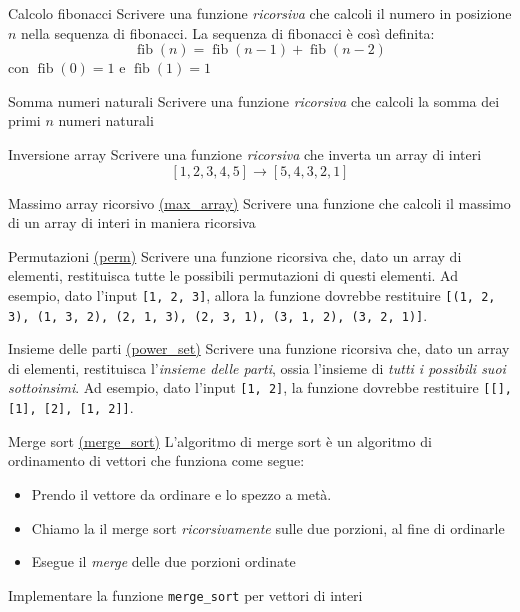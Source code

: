 \begin{esercizio}{Calcolo fibonacci}
	Scrivere una funzione \textit{ricorsiva} che calcoli il numero in posizione $ n $ nella sequenza di fibonacci. La sequenza di fibonacci è così definita:
	\[
		\operatorname{fib}\left(n\right) = \operatorname{fib}\left(n-1\right) + \operatorname{fib}\left(n-2\right)
	\]
	con $ \operatorname{fib}\left(0\right) = 1 $ e $ \operatorname{fib}\left(1\right) = 1 $
\end{esercizio}

\begin{esercizio}{Somma numeri naturali}
	Scrivere una funzione \textit{ricorsiva} che calcoli la somma dei primi $ n $ numeri naturali
\end{esercizio}

\begin{esercizio}{Inversione array}
	Scrivere una funzione \textit{ricorsiva} che inverta un array di interi
	\[
		\left[1,2,3,4,5\right] \rightarrow \left[5,4,3,2,1\right]
	\]
\end{esercizio}
\begin{esercizio}{Massimo array ricorsivo \href{run:./files/python/esercizi/ricorsione}{(max\_array)}}
	Scrivere una funzione che calcoli il massimo di un array di interi in maniera ricorsiva
\end{esercizio}

\begin{esercizio}{Permutazioni \href{run:./files/python/esercizi/ricorsione}{(perm)}}
	Scrivere una funzione ricorsiva che, dato un array di elementi, restituisca tutte le possibili permutazioni di questi elementi. Ad esempio, dato l'input \verb|[1, 2, 3]|, allora la funzione dovrebbe restituire \verb|[(1, 2, 3), (1, 3, 2), (2, 1, 3), (2, 3, 1), (3, 1, 2), (3, 2, 1)]|.
\end{esercizio}

\begin{esercizio}{Insieme delle parti \href{run:./files/python/esercizi/ricorsione}{(power\_set)}}
	Scrivere una funzione ricorsiva che, dato un array di elementi, restituisca l'\textit{insieme delle parti}, ossia l'insieme di \textit{tutti i possibili suoi sottoinsimi}. Ad esempio, dato l'input \verb|[1, 2]|, la funzione dovrebbe restituire \verb|[[], [1], [2], [1, 2]]|.
\end{esercizio}


\begin{esercizio}{Merge sort \href{run:./files/python/esercizi/ricorsione}{(merge\_sort)}}
	L'algoritmo di merge sort è un algoritmo di ordinamento di vettori che funziona come segue:
	\begin{itemize}
		\item Prendo il vettore da ordinare e lo spezzo a metà.
		\item Chiamo la il merge sort \textit{ricorsivamente} sulle due porzioni, al fine di ordinarle
		\item Esegue il \textit{merge} delle due porzioni ordinate
	\end{itemize}
	Implementare la funzione \verb|merge_sort| per vettori di interi
\end{esercizio}

